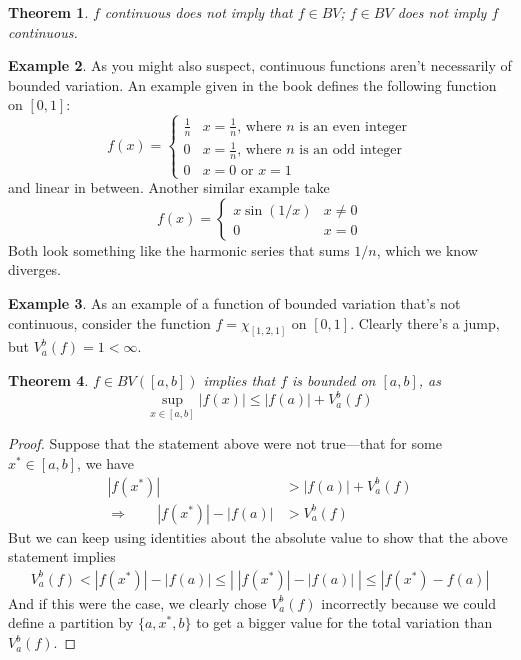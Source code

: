 \documentclass[12pt]{article}
\theoremstyle{plain}
\newtheorem{thm}{Theorem}[subsection]
\theoremstyle{definition}
\newtheorem{ex}[thm]{Example}
\theoremstyle{remark}
\begin{document}
\begin{thm}
$f$ continuous does not imply that $f\in BV$; $f \in BV$ does not imply $f$ continuous.
\end{thm}
\begin{ex}
As you might also suspect, continuous functions aren't necessarily of bounded variation. An example given in the book defines the following function on $[0,1]$:
    \[ f(x) = 
        \begin{cases}
        \frac{1}{n} & \text{$x = \frac{1}{n}$, where $n$ is an even integer}\\
        0 & \text{$x = \frac{1}{n}$, where $n$ is an odd integer} \\
        0 & \text{$x = 0$ or $x = 1$}
        \end{cases}
    \]
and linear in between.  Another similar example take
    \[ f(x) = 
        \begin{cases}
            x \sin(1/x) & x\neq 0 \\
            0 & x=0 
        \end{cases} \]
Both look something like the harmonic series that sums $1/n$, which we know diverges.
\end{ex}
\begin{ex}
As an example of a function of bounded variation that's not continuous, consider the function $f=\chi_{[1,2,1]}$ on $[0,1]$. Clearly there's a jump, but $V_a^b(f) = 1 < \infty$.
\end{ex}

\begin{thm}
$f\in BV([a,b])$ implies that $f$ is bounded on $[a,b]$, as 
    \[ \sup_{x\in[a,b]} |f(x) | \leq |f(a)| + V_a^b(f) \]
\end{thm}
\begin{proof}
Suppose that the statement above were not true---that for some $x^* \in [a,b]$, we have
\begin{align*}
    |f(x^*)| &> |f(a)| + V_a^b(f) \\
    \Rightarrow \qquad 
        |f(x^*)| - |f(a)|  &> V_a^b(f) 
\end{align*}
But we can keep using identities about the absolute value to show that the above statement implies
\begin{align*}
    V_a^b(f) < |f(x^*)| - |f(a)| \leq \left\lvert \;
        |f(x^*)| - |f(a)|\;\right\rvert
        \leq |f(x^*) - f(a)|
\end{align*}
And if this were the case, we clearly chose $V_a^b(f)$ incorrectly because we could define a partition by $\{a, x^*, b\}$ to get a bigger value for the total variation than $V_a^b(f)$.
\end{proof}
\end{document}
